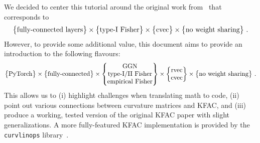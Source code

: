 We decided to center this tutorial around the original work from~\citet{martens2015optimizing} that corresponds to
\begin{align*}
  \begin{Bmatrix}
    \text{fully-connected layers}
  \end{Bmatrix}
  \times
  \begin{Bmatrix}
    \text{type-I Fisher}
  \end{Bmatrix}
  \times
  \begin{Bmatrix}
    \operatorname{cvec}
  \end{Bmatrix}
  \times
  \begin{Bmatrix}
    \text{no weight sharing}
  \end{Bmatrix}\,.
\end{align*}
However, to provide some additional value, this document aims to provide an introduction to the following flavours:
\begin{align*}
  \begin{Bmatrix}
    \text{PyTorch}
  \end{Bmatrix}
  \times
  \begin{Bmatrix}
    \text{fully-connected}
  \end{Bmatrix}
  \times
  \begin{Bmatrix}
    \text{GGN}
    \\
    \text{type-I/II Fisher}
    \\
    \text{empirical Fisher}
  \end{Bmatrix}
  \times
  \begin{Bmatrix}
    \operatorname{rvec}
    \\
    \operatorname{cvec}
  \end{Bmatrix}
  \times
  \begin{Bmatrix}
    \text{no weight sharing}
  \end{Bmatrix}\,.
\end{align*}
This allows us to (i) highlight challenges when translating math to code, (ii) point out various connections between curvature matrices and KFAC, and (iii) produce a working, tested version of the original KFAC paper with slight generalizations.
A more fully-featured KFAC implementation is provided by the \texttt{curvlinops} library~\cite{dangel2025position}.
